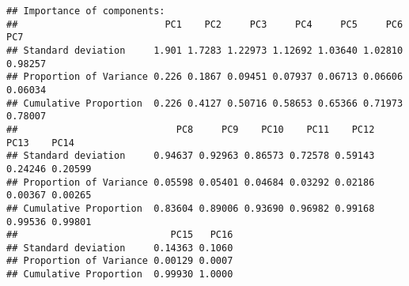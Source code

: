 \documentclass[
]{article}
\newenvironment{Shaded}{\begin{snugshade}}{\end{snugshade}}
\newcommand{\DocumentationTok}[1]{\textcolor[rgb]{0.56,0.35,0.01}{\textbf{\textit{#1}}}}
\newcommand{\NormalTok}[1]{#1}
\newcommand{\SpecialCharTok}[1]{\textcolor[rgb]{0.81,0.36,0.00}{\textbf{#1}}}
\begin{document}
\begin{verbatim}
## Importance of components:
##                          PC1    PC2     PC3     PC4     PC5     PC6     PC7
## Standard deviation     1.901 1.7283 1.22973 1.12692 1.03640 1.02810 0.98257
## Proportion of Variance 0.226 0.1867 0.09451 0.07937 0.06713 0.06606 0.06034
## Cumulative Proportion  0.226 0.4127 0.50716 0.58653 0.65366 0.71973 0.78007
##                            PC8     PC9    PC10    PC11    PC12    PC13    PC14
## Standard deviation     0.94637 0.92963 0.86573 0.72578 0.59143 0.24246 0.20599
## Proportion of Variance 0.05598 0.05401 0.04684 0.03292 0.02186 0.00367 0.00265
## Cumulative Proportion  0.83604 0.89006 0.93690 0.96982 0.99168 0.99536 0.99801
##                           PC15   PC16
## Standard deviation     0.14363 0.1060
## Proportion of Variance 0.00129 0.0007
## Cumulative Proportion  0.99930 1.0000
\end{verbatim}

\begin{Shaded}
\end{Shaded}
\end{document}
